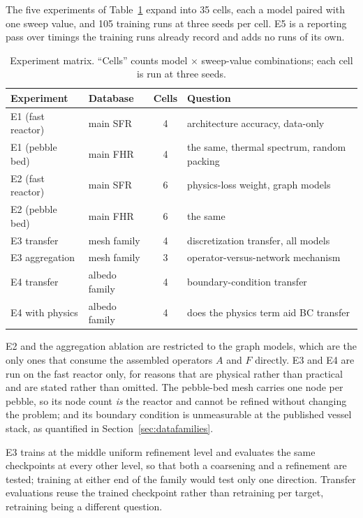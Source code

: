 \documentclass[preprint,12pt]{elsarticle}
\begin{document}
The five experiments of Table~\ref{tab:experiments} expand into 35 cells, each
a model paired with one sweep value, and 105 training runs at three seeds per
cell. E5 is a reporting pass over timings the training runs already record and
adds no runs of its own.

\begin{table}[htbp]
\centering
\caption{Experiment matrix. ``Cells'' counts model $\times$ sweep-value
combinations; each cell is run at three seeds.}
\label{tab:experiments}
\begin{tabular}{@{}llcl@{}}
\toprule
Experiment & Database & Cells & Question \\
\midrule
E1 (fast reactor) & main SFR      & 4 & architecture accuracy, data-only \\
E1 (pebble bed)   & main FHR      & 4 & the same, thermal spectrum, random packing \\
E2 (fast reactor) & main SFR      & 6 & physics-loss weight, graph models \\
E2 (pebble bed)   & main FHR      & 6 & the same \\
E3 transfer       & mesh family   & 4 & discretization transfer, all models \\
E3 aggregation    & mesh family   & 3 & operator-versus-network mechanism \\
E4 transfer       & albedo family & 4 & boundary-condition transfer \\
E4 with physics   & albedo family & 4 & does the physics term aid BC transfer \\
\bottomrule
\end{tabular}
\end{table}

E2 and the aggregation ablation are restricted to the graph models, which are
the only ones that consume the assembled operators $A$ and $F$ directly. E3 and
E4 are run on the fast reactor only, for reasons that are physical rather than
practical and are stated rather than omitted. The pebble-bed mesh carries one
node per pebble, so its node count \emph{is} the reactor and cannot be refined
without changing the problem; and its boundary condition is unmeasurable at the
published vessel stack, as quantified in Section~\ref{sec:datafamilies}.

E3 trains at the middle uniform refinement level and evaluates the same
checkpoints at every other level, so that both a coarsening and a refinement are
tested; training at either end of the family would test only one direction.
Transfer evaluations reuse the trained checkpoint rather than retraining per
target, retraining being a different question.
\end{document}
